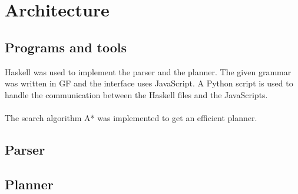 \chapter{Architecture}

\section{Programs and tools}
Haskell was used to implement the parser and the planner. The given grammar was written in GF and the interface uses JavaScript. A Python script is used to handle the communication between the Haskell files and the JavaScripts.\\\\
The search algorithm A* was implemented to get an efficient planner.
\section{Parser}


\section{Planner}


